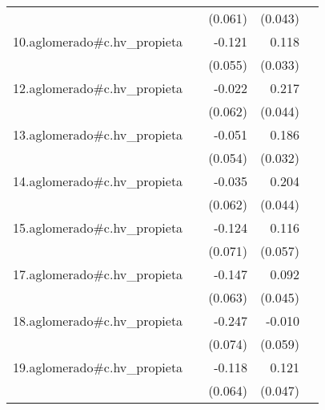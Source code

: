 {\begin{longtable}{l*{4}{D{.}{.}{-1}}}
            &                     &     (0.061)         &     (0.043)         &                     \\
\addlinespace
10.aglomerado#c.hv\_propieta&                     &      -0.121\sym{*}  &       0.118\sym{***}&                     \\
            &                     &     (0.055)         &     (0.033)         &                     \\
\addlinespace
12.aglomerado#c.hv\_propieta&                     &      -0.022         &       0.217\sym{***}&                     \\
            &                     &     (0.062)         &     (0.044)         &                     \\
\addlinespace
13.aglomerado#c.hv\_propieta&                     &      -0.051         &       0.186\sym{***}&                     \\
            &                     &     (0.054)         &     (0.032)         &                     \\
\addlinespace
14.aglomerado#c.hv\_propieta&                     &      -0.035         &       0.204\sym{***}&                     \\
            &                     &     (0.062)         &     (0.044)         &                     \\
\addlinespace
15.aglomerado#c.hv\_propieta&                     &      -0.124         &       0.116\sym{*}  &                     \\
            &                     &     (0.071)         &     (0.057)         &                     \\
\addlinespace
17.aglomerado#c.hv\_propieta&                     &      -0.147\sym{*}  &       0.092\sym{*}  &                     \\
            &                     &     (0.063)         &     (0.045)         &                     \\
\addlinespace
18.aglomerado#c.hv\_propieta&                     &      -0.247\sym{***}&      -0.010         &                     \\
            &                     &     (0.074)         &     (0.059)         &                     \\
\addlinespace
19.aglomerado#c.hv\_propieta&                     &      -0.118         &       0.121\sym{*}  &                     \\
            &                     &     (0.064)         &     (0.047)         &                     \\

\end{longtable}}
